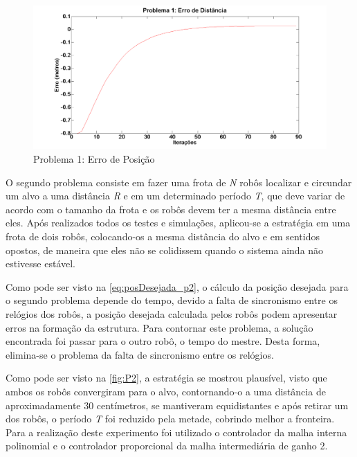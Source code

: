 \begin{figure}[!htb]
	\centering
	\includegraphics[width=.9\linewidth]{./Testes/Problema1/Incremental/ErroDistancia}
	\caption{Problema 1: Erro de Posição}
	\label{fig:P12Erro}
\end{figure}

O segundo problema consiste em fazer uma frota de \emph{N} robôs localizar e circundar um alvo a uma distância \emph{R} e em um determinado período \emph{T}, que deve variar de acordo com o tamanho da frota e os robôs devem ter a mesma distância entre eles. Após realizados todos os testes e simulações, aplicou-se a estratégia em uma frota de dois robôs, colocando-os a mesma distância do alvo e em sentidos opostos, de maneira que eles não se colidissem quando o sistema ainda não estivesse estável. 

Como pode ser visto na \autoref{eq:posDesejada_p2}, o cálculo da posição desejada para o segundo problema depende do tempo, devido a falta de sincronismo entre os relógios dos robôs, a posição desejada calculada pelos robôs podem apresentar erros na formação da  estrutura. Para contornar este problema, a solução encontrada foi passar para o outro robô, o tempo do mestre. Desta forma, elimina-se o problema da falta de sincronismo entre os relógios. 

Como pode ser visto na \autoref{fig:P2}, a estratégia se mostrou plausível, visto que ambos os robôs convergiram para o alvo, contornando-o a uma distância de aproximadamente 30 centímetros, se mantiveram equidistantes e após retirar um dos robôs, o período \emph{T} foi reduzido pela metade, cobrindo melhor a fronteira. Para a realização deste experimento foi utilizado o controlador da malha interna polinomial e o controlador proporcional da malha intermediária de ganho 2.

